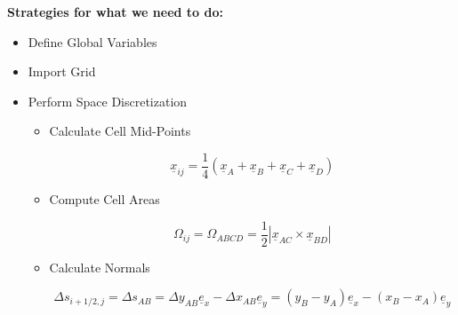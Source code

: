 \documentclass[12pt]{article}
\begin{document}
\textbf{Strategies for what we need to do:}\\
\begin{itemize}
    \item Define Global Variables
    \item Import Grid
    \item Perform Space Discretization
    \begin{itemize}
        \item Calculate Cell Mid-Points
        
        $$ \underline{x}_{ij} = \frac 1 4 \left( \underline{x}_A + \underline{x}_B + \underline{x}_C + \underline{x}_D \right) $$
        
        \item Compute Cell Areas
        
        $$ \Omega_{ij} = \Omega_{ABCD} = \frac 1 2 \left| \underline{x}_{AC} \times \underline{x}_{BD} \right| $$
        
        \item Calculate Normals
        
        $$ \Delta s_{i+1/2, j} = \Delta s_{AB} = \Delta y_{AB}\underline{e}_x - \Delta x_{AB}\underline{e}_y = \left( y_B - y_A \right)\underline{e}_x - \left( x_B - x_A \right)\underline{e}_y $$
        

\end{itemize}
\end{itemize}
\end{document}
